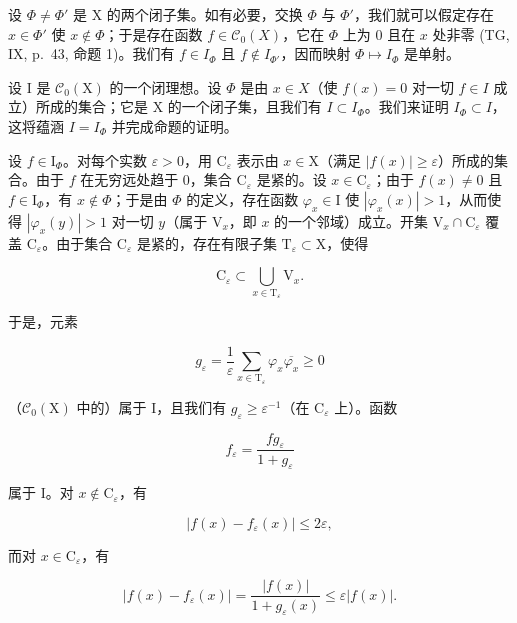设 \(\Phi \neq \Phi'\) 是 X 的两个闭子集。如有必要，交换 \(\Phi\) 与 \(\Phi'\)，我们就可以假定存在 \(x \in \Phi'\) 使 \(x \notin \Phi\)；于是存在函数 \(f \in \mathcal{C}_0(X)\)，它在 \(\Phi\) 上为 0 且在 \(x\) 处非零 (TG, IX, p.~43, 命题 1)。我们有 \(f \in I_{\Phi}\) 且 \(f \notin I_{\Phi'}\)，因而映射 \(\Phi \mapsto I_{\Phi}\) 是单射。

设 I 是 \(\mathcal{C}_{0}(\mathrm{X})\) 的一个闭理想。设 \(\Phi\) 是由 \(x \in X\)（使 \(f(x) = 0\) 对一切 \(f \in I\) 成立）所成的集合；它是 X 的一个闭子集，且我们有 \(I \subset I_{\Phi}\)。我们来证明 \(I_{\Phi} \subset I\)，这将蕴涵 \(I = I_{\Phi}\) 并完成命题的证明。

设 \(f \in \mathrm{I}_{\Phi}\)。对每个实数 \(\varepsilon > 0\)，用 \(\mathrm{C}_{\varepsilon}\) 表示由 \(x \in \mathrm{X}\)（满足 \(|f(x)| \geqslant \varepsilon\)）所成的集合。由于 \(f\) 在无穷远处趋于 0，集合 \(\mathrm{C}_{\varepsilon}\) 是紧的。设 \(x \in \mathrm{C}_{\varepsilon}\)；由于 \(f(x) \neq 0\) 且 \(f \in \mathrm{I}_{\Phi}\)，有 \(x \notin \Phi\)；于是由 \(\Phi\) 的定义，存在函数 \(\varphi_x \in \mathrm{I}\) 使 \(|\varphi_x(x)| > 1\)，从而使得 \(|\varphi_x(y)| > 1\) 对一切 \(y\)（属于 \(\mathrm{V}_x\)，即 \(x\) 的一个邻域）成立。开集 \(\mathrm{V}_x \cap \mathrm{C}_{\varepsilon}\) 覆盖 \(\mathrm{C}_{\varepsilon}\)。由于集合 \(\mathrm{C}_{\varepsilon}\) 是紧的，存在有限子集 \(\mathrm{T}_{\varepsilon} \subset \mathrm{X}\)，使得

\[
\mathrm{C} _ {\varepsilon} \subset \bigcup_ {x \in \mathrm{T} _ {\varepsilon}} \mathrm{V} _ {x}.
\]

于是，元素

\[
g _ {\varepsilon} = \frac {1}{\varepsilon} \sum_ {x \in \mathrm{T} _ {\varepsilon}} \varphi_ {x} \overline {{\varphi_ {x}}} \geqslant 0
\]

（\(\mathcal{C}_0(\mathrm{X})\) 中的）属于 I，且我们有 \(g_{\varepsilon} \geqslant \varepsilon^{-1}\)（在 \(\mathrm{C}_{\varepsilon}\) 上）。函数

\[
f _ {\varepsilon} = \frac {f g _ {\varepsilon}}{1 + g _ {\varepsilon}}
\]

属于 I。对 \(x \notin \mathrm{C}_{\varepsilon}\)，有

\[
\left| f (x) - f _ {\varepsilon} (x) \right| \leqslant 2 \varepsilon ,
\]

而对 \(x\in \mathrm{C}_{\varepsilon}\)，有

\[
| f (x) - f _ {\varepsilon} (x) | = \frac {| f (x) |}{1 + g _ {\varepsilon} (x)} \leqslant \varepsilon | f (x) |.
\]

